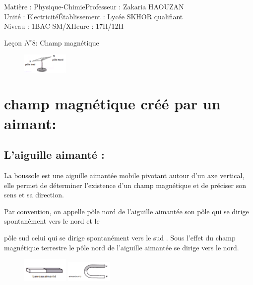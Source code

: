 \documentclass[12pt]{article}
\author{Zakaria HAOUZAN}
\date{\today}
\newcommand\headerMe[2]{\noindent{}#1\hfill#2}
\begin{document}
\headerMe{Matière : Physique-Chimie}{Professeur : Zakaria HAOUZAN}\\
\headerMe{Unité : Electricité}{Établissement : Lycée SKHOR qualifiant}\\
\headerMe{Niveau : 1BAC-SM/X}{Heure : 17H/12H}\\




\begin{center}

    \Large{Leçon $N^{\circ} 8 $: \color{red}Champ magnétique }
\end{center}

\begin{figure}
  \vspace{-1cm}
    \includegraphics[width=0.2\textwidth]{./img/boussole.png}
\end{figure}
  \section{ champ magnétique créé par un aimant:}
  \subsection{L’aiguille aimanté :}
La boussole est une aiguille aimantée mobile pivotant autour d'un axe vertical, elle permet de déterminer
l’existence d’un champ magnétique et de préciser son sens et sa direction.

Par convention, on appelle pôle nord de l’aiguille aimantée son pôle qui se dirige spontanément vers le nord et le

  pôle sud celui qui se dirige spontanément vers le sud .
Sous l’effet du champ magnétique terrestre le pôle nord de l’aiguille aimantée se dirige vers le nord.

\begin{figure}
  \vspace{-2cm}
    \includegraphics[width=0.2\textwidth]{./img/barreauAimante.png}
    \includegraphics[width=0.2\textwidth]{./img/Aimant_U.png}
    
\end{figure}
\end{document}

